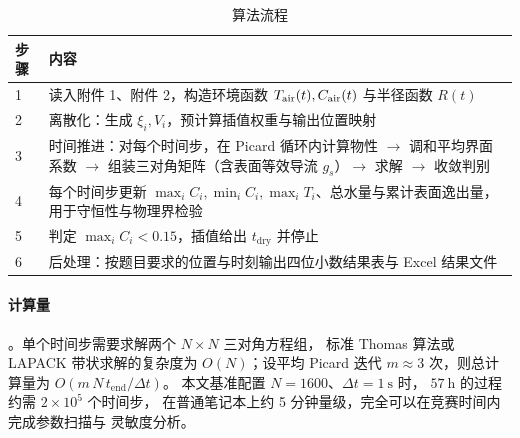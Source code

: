 \begin{table}[H]
\centering
\caption{算法流程}\label{tab:algo}
\small
\begin{tabular}{@{}p{1.1cm}p{13.2cm}@{}}
\toprule
步骤 & 内容 \\
\midrule
1 & 读入附件 1、附件 2，构造环境函数 $T_{\mathrm{air}}(t),C_{\mathrm{air}}(t)$ 与半径函数 $R(t)$ \\
2 & 离散化：生成 $\xi_i,V_i$，预计算插值权重与输出位置映射 \\
3 & 时间推进：对每个时间步，在 Picard 循环内计算物性 $\to$ 调和平均界面系数
    $\to$ 组装三对角矩阵（含表面等效导流 $g_s$）$\to$ 求解 $\to$ 收敛判别 \\
4 & 每个时间步更新 $\max_iC_i,\min_iC_i,\max_iT_i$、总水量与累计表面逸出量，
    用于守恒性与物理界检验 \\
5 & 判定 $\max_iC_i<0.15$，插值给出 $t_{\mathrm{dry}}$ 并停止 \\
6 & 后处理：按题目要求的位置与时刻输出四位小数结果表与 Excel 结果文件 \\
\bottomrule
\end{tabular}
\end{table}

\paragraph{计算量}。单个时间步需要求解两个 $N\times N$ 三对角方程组，
标准 Thomas 算法或 LAPACK 带状求解的复杂度为 $O(N)$；设平均 Picard 迭代
$m\approx3$ 次，则总计算量为 $O(m\,N\,t_{\mathrm{end}}/\Delta t)$。
本文基准配置 $N=1600$、$\Delta t=1\ \mathrm{s}$ 时，
$57\ \mathrm{h}$ 的过程约需 $2\times10^{5}$ 个时间步，
在普通笔记本上约 5 分钟量级，完全可以在竞赛时间内完成参数扫描与
灵敏度分析。
